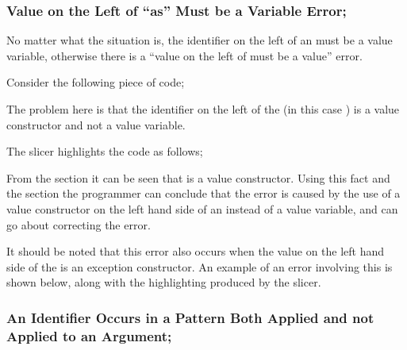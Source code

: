 \documentclass{report}
\begin{document}
\begin{itemize}

\subsubsection{Value on the Left of ``as'' Must be a Variable Error;}

\subitem No matter what the situation is, the identifier on the left
of an  must be a value variable, otherwise there is
a ``value on the left of  must be a value'' error.

Consider the following piece of code;


The problem here is that the identifier on the left of the
 (in this case ) is a value
constructor and not a value variable.

The slicer highlights the code as follows;


From the section 
it can be seen that  is a value constructor. Using this
fact and the section  the
programmer can conclude that the error is caused by the use of a value
constructor on the left hand side of an  instead of
a value variable, and can go about correcting the error.

It should be noted that this error also occurs when the value on the
left hand side of the  is an exception constructor.
An example of an error involving this is shown below, along with the
highlighting produced by the slicer.





\newpage


\subsubsection{An Identifier Occurs in a Pattern Both Applied and not Applied
  to an Argument;}


\end{itemize}
\end{document}
